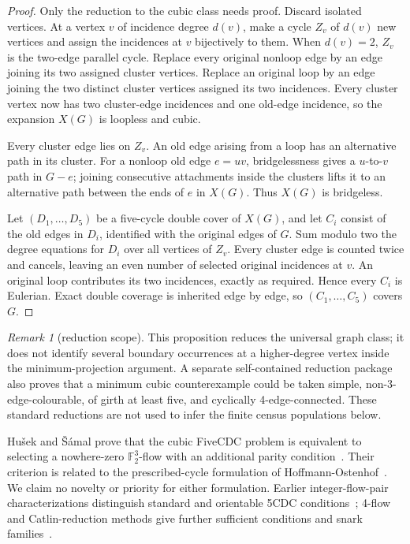 \documentclass[11pt]{article}
\theoremstyle{definition}
\theoremstyle{remark}
\newtheorem{remark}[theorem]{Remark}
\newcommand{\F}{\mathbb F}
\begin{document}
\begin{proof}
Only the reduction to the cubic class needs proof.  Discard isolated
vertices.  At a vertex \(v\) of incidence degree \(d(v)\), make a cycle
\(Z_v\) of \(d(v)\) new vertices and assign the incidences at \(v\)
bijectively to them.  When \(d(v)=2\), \(Z_v\) is the two-edge parallel
cycle.  Replace every original nonloop edge by an edge joining its two
assigned cluster vertices.  Replace an original loop by an edge joining
the two distinct cluster vertices assigned its two incidences.  Every
cluster vertex now has two cluster-edge incidences and one old-edge
incidence, so the expansion \(X(G)\) is loopless and cubic.

Every cluster edge lies on \(Z_v\).  An old edge arising from a loop has
an alternative path in its cluster.  For a nonloop old edge \(e=uv\),
bridgelessness gives a \(u\)-to-\(v\) path in \(G-e\); joining consecutive
attachments inside the clusters lifts it to an alternative path between
the ends of \(e\) in \(X(G)\).  Thus \(X(G)\) is bridgeless.

Let \((D_1,\ldots,D_5)\) be a five-cycle double cover of \(X(G)\), and
let \(C_i\) consist of the old edges in \(D_i\), identified with the
original edges of \(G\).  Sum modulo two the degree equations for \(D_i\)
over all vertices of \(Z_v\).  Every cluster edge is counted twice and
cancels, leaving an even number of selected original incidences at \(v\).
An original loop contributes its two incidences, exactly as required.
Hence every \(C_i\) is Eulerian.  Exact double coverage is inherited
edge by edge, so \((C_1,\ldots,C_5)\) covers \(G\).
\end{proof}

\begin{remark}[reduction scope]
This proposition reduces the universal graph class; it does not identify
several boundary occurrences at a higher-degree vertex inside the
minimum-projection argument.  A separate self-contained reduction package
also proves that a minimum cubic counterexample could be taken simple,
non-3-edge-colourable, of girth at least five, and cyclically
4-edge-connected.  These standard reductions are not used to infer the
finite census populations below.
\end{remark}

Hu\v{s}ek and \v{S}\'amal prove that the cubic FiveCDC problem is equivalent
to selecting a nowhere-zero \(\F_2^3\)-flow with an additional parity
condition~\cite[Theorem~3.16 and Conjecture~3.19]{HusekSamal2026}.  Their
criterion is related to the prescribed-cycle formulation of
Hoffmann-Ostenhof~\cite{HoffmannOstenhof2013}.  We claim no novelty or
priority for either formulation.  Earlier integer-flow-pair
characterizations distinguish standard and orientable 5CDC
conditions~\cite{XieZhang2009}; 4-flow and Catlin-reduction methods give
further sufficient conditions and snark families~\cite{LiuHaoLuoZhang2023}.
\end{document}
